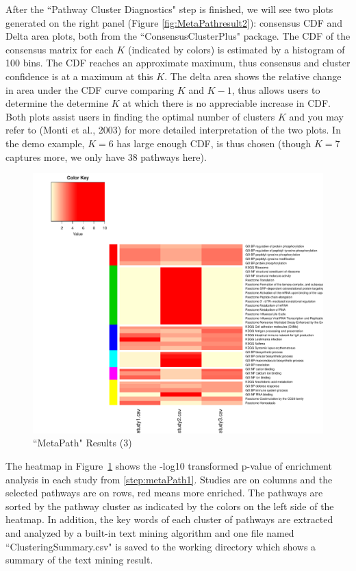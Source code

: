 After the ``Pathway Cluster Diagnostics" step is finished, we will see two plots generated on the right panel (Figure \ref{fig:MetaPathresult2}): consensus CDF and Delta area plots, both from the ``ConsensusClusterPlus" package. The CDF of the consensus matrix for each $K$ (indicated by colors) is estimated by a histogram of 100 bins. The CDF
reaches an approximate maximum, thus consensus and cluster confidence is at a maximum at this $K$. The delta area shows the relative change in area under the CDF curve comparing $K$ and $K - 1$, thus allows users to determine the determine $K$ at which there is no appreciable increase in CDF. Both plots assist users in finding the optimal number of clusters $K$ and you may refer to (Monti et al., 2003) for more detailed interpretation of the two plots. In the demo example, $K=6$ has large enough CDF, is thus chosen (though $K=7$ captures more, we only have 38 pathways here). 

\begin{figure}[H]
\begin{center}
\includegraphics[scale=0.6]{./figure/metaPath/Heatmap_clusters_all.pdf}
\caption{``MetaPath" Results (3)}
\label{fig:MetaPathresult3}
\end{center}
\end{figure}


The heatmap in Figure~\ref{fig:MetaPathresult3} shows the -log10 transformed p-value of enrichment analysis in each study from \ref{step:metaPath1}. 
Studies are on columns and the selected pathways are on rows, red means more enriched. The pathways are sorted by the pathway cluster as indicated by the colors on the left side of the heatmap. 
In addition, 
the key words of each cluster of pathways are extracted and analyzed by a built-in text mining algorithm and one file named ``Clustering\textunderscore Summary.csv" is saved to the working directory which shows a summary of the text mining result. 



